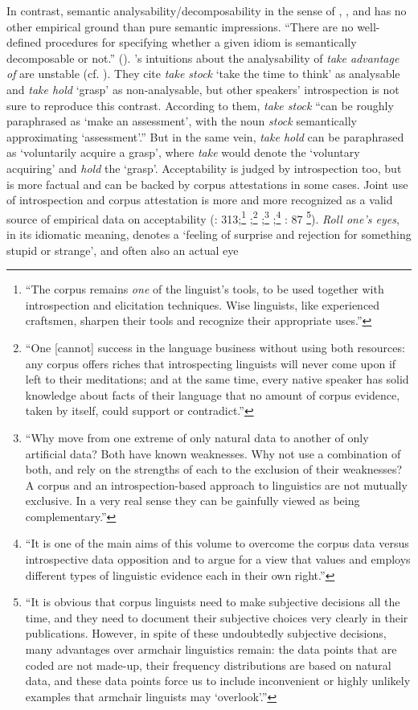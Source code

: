 \documentclass[output=paper]{langsci/langscibook}
\begin{document}
In contrast, semantic analysability\slash decomposability in the sense of   \citet{Gibbs1989}, \cite[508]{Nunberg1994}, \cite{Sag:2002} and  \cite{Baldwin2010} has no other empirical ground than pure semantic impressions. “There are no well-defined procedures for specifying whether a given idiom is semantically decomposable or not.”  (\citealt[106]{Gibbs1989}). \cite[524]{Nunberg1994}'s intuitions about the analysability of \textit{take advantage of} are unstable (cf. ). They cite \textit{take stock} ‘take the time to think’ as analysable and\textit{ take hold} ‘grasp’ as non-analysable, but other speakers’ introspection is not sure to reproduce this contrast. According to them, \textit{take stock} “can be roughly paraphrased as ‘make an assessment’, with the noun \textit{stock} semantically approximating ‘assessment’.” But in the same vein, \textit{take hold} can be paraphrased as ‘voluntarily acquire a grasp’, where \textit{take} would denote the ‘voluntary acquiring’ and \textit{hold} the ‘grasp’. Acceptability is judged by introspection too, but is more factual and can be backed by corpus attestations in some cases. Joint use of introspection and corpus attestation is more and more recognized as a valid source of empirical data on acceptability (\citealt{Johansson1991}: 313;\footnote{ “The corpus remains \textit{one} of the linguist’s tools, to be used together with introspection and elicitation techniques. Wise linguists, like experienced craftsmen, sharpen their tools and recognize their appropriate uses.”} \citealt[1]{Fillmore2001};\footnote{ “One [cannot] success in the language business without using both resources: any corpus offers riches that introspecting linguists will never come upon if left to their meditations; and at the same time, every native speaker has solid knowledge about facts of their language that no amount of corpus evidence, taken by itself, could support or contradict.”}   \citealt[16]{McEnery1996};\footnote{ “Why move from one extreme of only natural data to another of only artificial data? Both have known weaknesses. Why not use a combination of both, and rely on the strengths of each to the exclusion of their weaknesses? A corpus and an introspection-based approach to linguistics are not mutually exclusive. In a very real sense they can be gainfully viewed as being complementary.”}  \citealt{Kepser2005};\footnote{ “It is one of the main aims of this volume to overcome the corpus data versus introspective data opposition and to argue for a view that values and employs different types of linguistic evidence each in their own right.”} \citealt{Gries2011}: 87 \footnote{ “It is obvious that corpus linguists need to make subjective decisions all the time, and they need to document their subjective choices very clearly in their publications. However, in spite of these undoubtedly subjective decisions, many advantages over armchair linguistics remain: the data points that are coded are not made-up, their frequency distributions are based on natural data, and these data points force us to include inconvenient or highly unlikely examples that armchair linguists may ‘overlook’.”}). \textit{Roll one’s eyes}, in its idiomatic meaning, denotes a ‘feeling of surprise and rejection for something stupid or strange’, and often also an actual eye 
\end{document}
